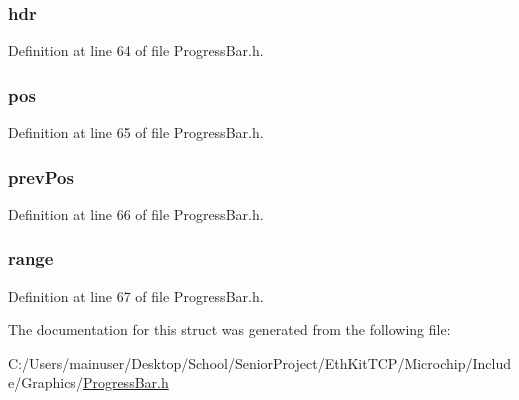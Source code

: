 \subsubsection[{hdr}]{ hdr}\label{struct_p_r_o_g_r_e_s_s_b_a_r_abeffaf353197a8a64fba6707b68ce0be}


Definition at line 64 of file Progress\+Bar.\+h.

\hypertarget{struct_p_r_o_g_r_e_s_s_b_a_r_a334282e8dc9fb36245b63e871c6ed478}{}
\subsubsection[{pos}]{ pos}\label{struct_p_r_o_g_r_e_s_s_b_a_r_a334282e8dc9fb36245b63e871c6ed478}


Definition at line 65 of file Progress\+Bar.\+h.

\hypertarget{struct_p_r_o_g_r_e_s_s_b_a_r_ae5ba3b8b09a4e59718a9e126fab813fe}{}
\subsubsection[{prev\+Pos}]{ prev\+Pos}\label{struct_p_r_o_g_r_e_s_s_b_a_r_ae5ba3b8b09a4e59718a9e126fab813fe}


Definition at line 66 of file Progress\+Bar.\+h.

\hypertarget{struct_p_r_o_g_r_e_s_s_b_a_r_ab4dbd97dae01a95fd9e0deea02589374}{}
\subsubsection[{range}]{ range}\label{struct_p_r_o_g_r_e_s_s_b_a_r_ab4dbd97dae01a95fd9e0deea02589374}


Definition at line 67 of file Progress\+Bar.\+h.



The documentation for this struct was generated from the following file\+:\begin{DoxyCompactItemize}
\item 
C\+:/\+Users/mainuser/\+Desktop/\+School/\+Senior\+Project/\+Eth\+Kit\+T\+C\+P/\+Microchip/\+Include/\+Graphics/\hyperlink{_progress_bar_8h}{Progress\+Bar.\+h}\end{DoxyCompactItemize}

